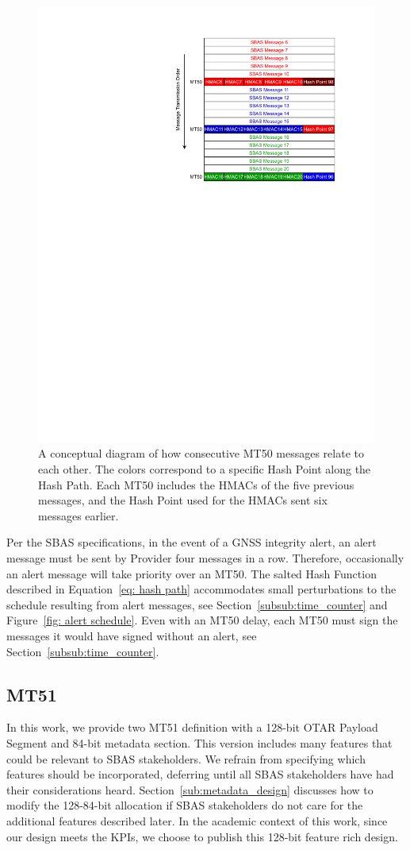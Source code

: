 \documentclass[letterpaper,times]{IONconf/IONconf}
\begin{document}
		\begin{figure}%
			\centering
			\includegraphics[width=0.5\linewidth]{fig/MT50Schedule.pdf}
			\caption{
				A conceptual diagram of how consecutive MT50 messages relate to each other.
				The colors correspond to a specific Hash Point along the Hash Path. Each MT50 includes the HMACs of the five previous messages, and the Hash Point used for the HMACs sent six messages earlier.
			}
			\label{fig: MT50 Schedule}
		\end{figure}

		Per the SBAS specifications, in the event of a GNSS integrity alert, an alert message must be sent by Provider four messages in a row.
		Therefore,  occasionally an alert message will take priority over an MT50.
		The salted Hash Function described in Equation~\eqref{eq: hash path} accommodates small perturbations to the schedule resulting from alert messages, see Section~\ref{subsub:time_counter} and Figure~\ref{fig: alert schedule}.
		Even with an MT50 delay, each MT50 must sign the messages it would have signed without an alert, see Section~\ref{subsub:time_counter}.

	\subsection{MT51} \label{sub:mt51}

		In this work, we provide two MT51 definition with a 128-bit OTAR Payload Segment and 84-bit metadata section.
		This version includes many features that could be relevant to SBAS stakeholders. 
		We refrain from specifying which features should be incorporated, deferring until all SBAS stakeholders have had their considerations heard.
		Section~\ref{sub:metadata_design} discusses how to modify the 128-84-bit allocation if SBAS stakeholders do not care for the additional features described later.
		In the academic context of this work, since our design meets the KPIs, we choose to publish this 128-bit feature rich design.
		
\end{document}
